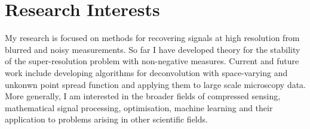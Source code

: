 \documentclass[10pt,a4paper,roman]{moderncv} %
\begin{document}


%
%
%
%
%


\makecvtitle %
 \vspace{-1em}




\section{Research Interests}
My research is focused on methods for recovering signals at high resolution
from blurred and noisy measurements.
So far I have developed theory for the stability of the super-resolution problem 
with non-negative measures. 
Current and future work include developing algorithms for deconvolution
with space-varying and unkonwn point spread function and applying 
them to large scale microscopy data.
More generally, I am interested in the broader fields of compressed sensing, 
mathematical signal processing, optimisation, machine learning 
and their application to problems arising in other scientific fields.



\end{document}
